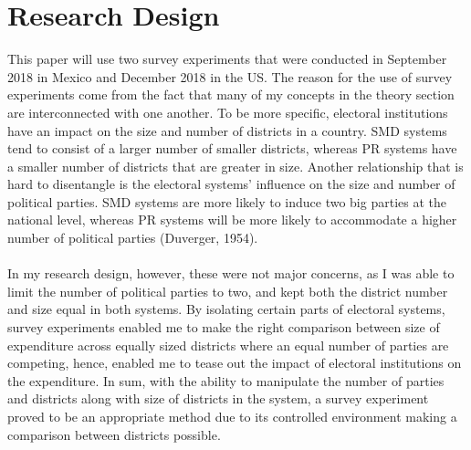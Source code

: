 \documentclass{article}
\begin{document}
\section{Research Design}
This paper will use two survey experiments that were conducted in September 2018 in Mexico and December 2018 in the US. The reason for the use of survey experiments come from the fact that many of my concepts in the theory section are interconnected with one another. To be more specific, electoral institutions have an impact on the size and number of districts in a country. SMD systems tend to consist of a larger number of smaller districts, whereas PR systems have a smaller number of districts that are greater in size. Another relationship that is hard to disentangle is the electoral systems' influence on the size and number of political parties. SMD systems are more likely to induce two big parties at the national level, whereas PR systems will be more likely to accommodate a higher number of political parties (Duverger, 1954).\\
\\
In my research design, however, these were not major concerns, as I was able to limit the number of political parties to two, and kept both the district number and size equal in both systems. By isolating certain parts of electoral systems, survey experiments enabled me to make the right comparison between size of expenditure across equally sized districts where an equal number of parties are competing, hence, enabled me to tease out the impact of electoral institutions on the expenditure. In sum, with the ability to manipulate the number of parties and districts along with size of districts in the system, a survey experiment proved to be an appropriate method due to its controlled environment making a comparison between districts possible.
\end{document}
